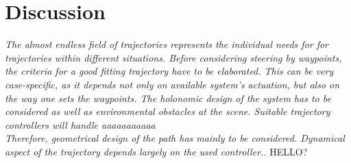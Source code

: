 \section{Discussion}
\label{sec:discussion}

\textit{The almost endless field of trajectories represents the individual needs for for trajectories within different situations. Before considering steering by waypoints, the criteria for a good fitting trajectory have to be elaborated. This can be very case-specific, as it depends not only on available system's actuation, but also on the way one sets the waypoints. The holonomic design of the system has to be considered as well as environmental obstacles at the scene. Suitable trajectory controllers will handle aaaaaaaaaaa\\ Therefore, geometrical design of the path has mainly to be considered. Dynamical aspect of the trajectory depends largely on the used controller..} HELLO?
